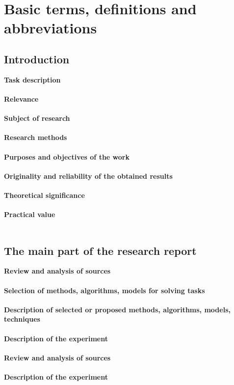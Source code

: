 \documentclass[draft]{article}
\begin{document}
\section {Basic terms, definitions and abbreviations}



\newpage
\begin{center}
\item\section {Introduction}
\end{center}
\textbf{Task description}\\
~\\
\textbf{Relevance}\\
~\\
\textbf{Subject of research}\\
~\\
\textbf{Research methods}\\
~\\
\textbf{Purposes and objectives of the work}\\
~\\
\textbf{Originality and reliability of the obtained results}\\
~\\
\textbf{Theoretical significance}\\
~\\
\textbf{Practical value}\\
~\\
\newpage
\begin{center}
\section {The main part of the research report}
\end{center}
\textbf{Review and analysis of sources}\\
~\\
\textbf{Selection of methods, algorithms, models for solving tasks}\\
~\\
\textbf{Description of selected or proposed methods, algorithms, models, techniques}\\
~\\
\textbf{Description of the experiment}\\
~\\
\textbf{Review and analysis of sources}\\
~\\
\textbf{Description of the experiment}\\
~\\
\end{document}
